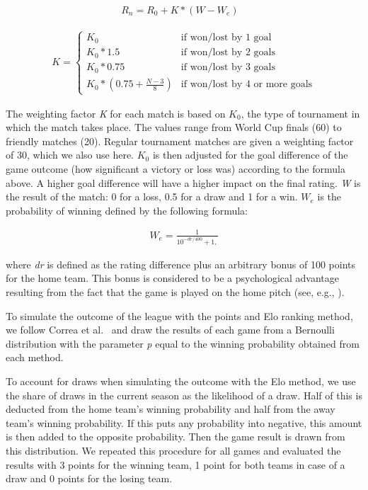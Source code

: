 \documentclass[12pt,a4paper]{article}
\begin{document}
\begin{align}
R_n = R_0 + K * (W - W_e) &
\end{align}

\begin{align}
K = \begin{cases}
    K_0         &\mbox{if won/lost by 1 goal} \\
    K_0 * 1.5   &\mbox{if won/lost by 2 goals} \\
    K_0 * 0.75  &\mbox{if won/lost by 3 goals} \\
    K_0 * \left( 0.75 + \frac{N-3}{8} \right) &\mbox{if won/lost by 4 or more goals}
  \end{cases}
\end{align}

The weighting factor \emph{K} for each match is based on \(K_0\), the
type of tournament in which the match takes place. The values range from
World Cup finals (60) to friendly matches (20). Regular tournament
matches are given a weighting factor of 30, which we also use here.
\(K_0\) is then adjusted for the goal difference of the game outcome
(how significant a victory or loss was) according to the formula above.
A higher goal difference will have a higher impact on the final rating.
\emph{W} is the result of the match: 0 for a loss, 0.5 for a draw and 1
for a win. \(W_e\) is the probability of winning defined by the
following formula:

\begin{align}
W_e = \frac{1}{10^{-dr/400}+1,}
\end{align}

where \emph{dr} is defined as the rating difference plus an arbitrary
bonus of 100 points for the home team. This bonus is considered to be a
psychological advantage resulting from the fact that the game is played
on the home pitch (see, e.g., \textcite{Pollard2008}).

To simulate the outcome of the league with the points and Elo ranking
method, we follow Correa et al.~\autocite*{correa} and draw the results
of each game from a Bernoulli distribution with the parameter \emph{p}
equal to the winning probability obtained from each method.

To account for draws when simulating the outcome with the Elo method, we
use the share of draws in the current season as the likelihood of a
draw. Half of this is deducted from the home team's winning probability
and half from the away team's winning probability. If this puts any
probability into negative, this amount is then added to the opposite
probability. Then the game result is drawn from this distribution. We
repeated this procedure for all games and evaluated the results with 3
points for the winning team, 1 point for both teams in case of a draw
and 0 points for the losing team.
\end{document}
